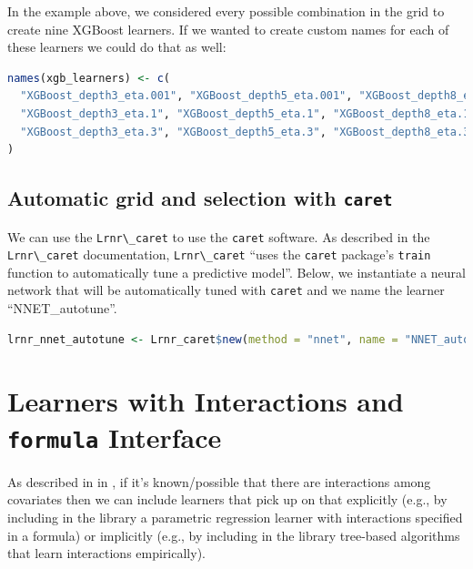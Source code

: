 \documentclass[
  12pt, krantz2,
]{krantz}
\newcommand{\passthrough}[1]{#1}
\newcommand{\1}{\mathbbm{1}}
\theoremstyle{definition}
\theoremstyle{definition}
\theoremstyle{definition}
\theoremstyle{definition}
\theoremstyle{remark}
\begin{document}
In the example above, we considered every possible combination in the grid to
create nine XGBoost learners. If we wanted to create custom names for each of
these learners we could do that as well:

\begin{lstlisting}[language=R]
names(xgb_learners) <- c(
  "XGBoost_depth3_eta.001", "XGBoost_depth5_eta.001", "XGBoost_depth8_eta.001", 
  "XGBoost_depth3_eta.1", "XGBoost_depth5_eta.1", "XGBoost_depth8_eta.1", 
  "XGBoost_depth3_eta.3", "XGBoost_depth5_eta.3", "XGBoost_depth8_eta.3"
)
\end{lstlisting}

\hypertarget{automatic-grid-and-selection-with-caret}{%
\subsection{\texorpdfstring{Automatic grid and selection with \texttt{caret}}{Automatic grid and selection with caret}}\label{automatic-grid-and-selection-with-caret}}

We can use the \passthrough{\lstinline!Lrnr\_caret!} to use the \passthrough{\lstinline!caret!} software. As described in the
\passthrough{\lstinline!Lrnr\_caret!} documentation, \passthrough{\lstinline!Lrnr\_caret!} ``uses the \passthrough{\lstinline!caret!} package's \passthrough{\lstinline!train!}
function to automatically tune a predictive model''. Below, we instantiate a
neural network that will be automatically tuned with \passthrough{\lstinline!caret!} and we name the
learner ``NNET\_autotune''.

\begin{lstlisting}[language=R]
lrnr_nnet_autotune <- Lrnr_caret$new(method = "nnet", name = "NNET_autotune")
\end{lstlisting}

\hypertarget{learners-with-interactions-and-formula-interface}{%
\section{\texorpdfstring{Learners with Interactions and \texttt{formula} Interface}{Learners with Interactions and formula Interface}}\label{learners-with-interactions-and-formula-interface}}

As described in in \citet{rvp2022super}, if it's known/possible that there are
interactions among covariates then we can include learners that pick up on that
explicitly (e.g., by including in the library a parametric regression learner
with interactions specified in a formula) or implicitly (e.g., by including in
the library tree-based algorithms that learn interactions empirically).
\end{document}
